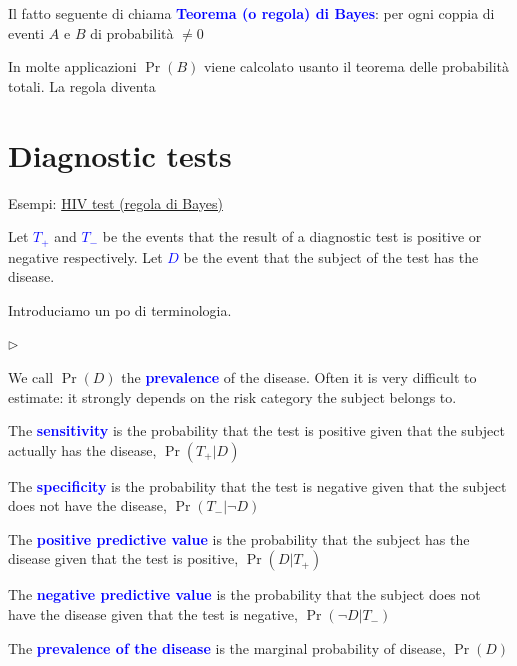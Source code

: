 \documentclass[12pt,openany]{book}
\newcommand{\mylabel}[1]{{\footnotesize\textsf{#1}}\hfill}
\renewenvironment{itemize}
  {\begin{list}{$\triangleright$}{%
   \setlength{\parskip}{0mm}
   \setlength{\topsep}{.2\baselineskip}
   \setlength{\rightmargin}{0mm}
   \setlength{\listparindent}{0mm}
   \setlength{\itemindent}{0mm}
   \setlength{\labelwidth}{3ex}
   \setlength{\itemsep}{.4\baselineskip}
   \setlength{\parsep}{0mm}
   \setlength{\partopsep}{0mm}
   \setlength{\labelsep}{1ex}
   \setlength{\leftmargin}{\labelwidth+\labelsep}
   \let\makelabel\mylabel}}{%
   \end{list}\vspace*{-1.3mm}}
\def\emph#1{\textcolor{blue}{\textbf{\boldmath #1}}}
\theoremstyle{mio}
\theoremstyle{liscio}
\begin{document}
Il fatto seguente di chiama \emph{Teorema (o regola) di Bayes}: per ogni coppia di eventi $A$ e $B$ di probabilit\`a $\neq0$ 

\ceq{\hfill \Pr(A|B)}{=}{\frac{\Pr(B|A)\cdot \Pr(A)}{\Pr(B)\vphantom{\Big[}}.}

In molte applicazioni $\Pr(B)$ viene calcolato usanto il teorema delle probabilità totali. La regola diventa

\ceq{}{=}{\frac{\Pr(B|A)\cdot \Pr(A)}{\Pr(B|A)\Pr(A)+\Pr(B|\neg A)\Pr(\neg A)\vphantom{\Big[}}.}






\hfill{}\clearpage\section{Diagnostic tests}


{\color{brown}Esempi:}  \hyperref[HIV_test]{HIV test (regola di Bayes) \faShare}

Let \emph{$T_+$\/} and \emph{$T_-$\/} be the events that the result of a diagnostic test
is positive or negative respectively. Let \emph{$D$\/} be the event that the subject of the test has the disease. 

Introduciamo un po di terminologia.

\begin{itemize}
\item We call $\Pr(D)$ the \emph{prevalence\/} of the disease. Often it is very difficult to estimate: it strongly depends on the risk category the subject belongs to.
\item The \emph{sensitivity\/} is the probability that the test is
positive given that the subject actually has the disease, $\Pr(T_+ | D)$
\item The \emph{specificity\/} is the probability that the test is
negative given that the subject does not have the disease, $\Pr(T_- | \neg D)$
\item The \emph{positive predictive value\/} is the probability that the subject has the
disease given that the test is positive, $\Pr(D | T_+)$
\item The \emph{negative predictive value\/} is the probability that the subject does not have
the disease given that the test is negative, $\Pr(\neg D | T_-)$
\item The \emph{prevalence of the disease\/} is the marginal probability of disease, $\Pr(D)$

\end{itemize}
\end{document}
